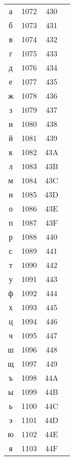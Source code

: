 \documentclass[10pt]{article}
\begin{document}
\begin{tabular}{crcl}
а&1072&430&\\
б&1073&431&\\
в&1074&432&\\
г&1075&433&\\
д&1076&434&\\
е&1077&435&\\
ж&1078&436&\\
з&1079&437&\\
и&1080&438&\\
й&1081&439&\\
к&1082&43A&\\
л&1083&43B&\\
м&1084&43C&\\
н&1085&43D&\\
о&1086&43E&\\
п&1087&43F&\\
р&1088&440&\\
с&1089&441&\\
т&1090&442&\\
у&1091&443&\\
ф&1092&444&\\
х&1093&445&\\
ц&1094&446&\\
ч&1095&447&\\
ш&1096&448&\\
щ&1097&449&\\
ъ&1098&44A&\\
ы&1099&44B&\\
ь&1100&44C&\\
э&1101&44D&\\
ю&1102&44E&\\
я&1103&44F&\\
\end{tabular}
\end{document}
